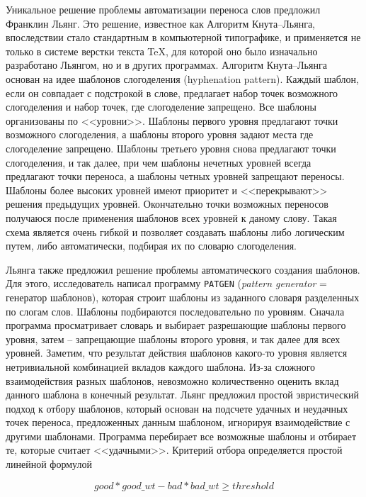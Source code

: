 \documentclass[12pt,a4paper,oneside]{extarticle}
\begin{document}
Уникальное решение проблемы автоматизации переноса слов предложил Франклин Льянг\autocite[][]{liang1983}. Это решение, известное как Алгоритм Кнута--Льянга, впоследствии стало стандартным в компьютерной типографике, и применяется не только в системе верстки текста \TeX{}, для которой оно было изначально разработано Льянгом, но и в других программах\autocite[Первое описание системы \TeX{} см. ][]{knuth1979}. Алгоритм Кнута--Льянга основан на идее шаблонов слогоделения (\textenglish{hyphenation pattern}).
Каждый шаблон, если он совпадает с подстрокой в слове, предлагает набор точек возможного слогоделения и набор точек, где слогоделение запрещено. Все шаблоны организованы по <<уровни>>. Шаблоны первого уровня предлагают точки возможного слогоделения, а шаблоны второго уровня
задают места где слогоделение запрещено. Шаблоны третьего уровня снова предлагают точки слогоделения, и так далее, при чем шаблоны нечетных уровней
всегда предлагают точки переноса, а шаблоны четных уровней запрещают переносы. 
Шаблоны более высоких уровней имеют приоритет и <<перекрывают>>
решения предыдущих уровней. Окончательно точки возможных переносов
получаюся после применения шаблонов всех уровней к даному слову. Такая схема является
очень гибкой и позволяет создавать шаблоны либо логическим путем, либо автоматически,
подбирая их по словарю слогоделения.

Льянга также предложил решение проблемы автоматического создания шаблонов. Для этого, исследователь написал программу \verb+PATGEN+ (\emph{pattern generator} = генератор шаблонов), которая строит шаблоны из заданного словаря разделенных по слогам слов. Шаблоны подбираются последовательно по уровням. Сначала программа просматривает словарь и выбирает разрешающие шаблоны первого уровня, затем -- запрещающие шаблоны второго уровня, и так далее для всех уровней. Заметим, что результат действия шаблонов какого-то уровня
является нетривиальной комбинацией вкладов каждого шаблона. Из-за сложного взаимодействия разных шаблонов, невозможно
количественно оценить вклад данного шаблона в конечный результат. Льянг предложил простой эвристический подход к отбору шаблонов,
который основан на подсчете удачных и неудачных точек переноса, предложенных данным шаблоном, игнорируя взаимодействие с другими шаблонами. Программа перебирает все возможные шаблоны и отбирает те, которые считает <<удачными>>. Критерий отбора определяется простой линейной формулой

\begin{equation}
\label{eff_formula}
good * good\_wt - bad * bad\_wt \geq threshold
\end{equation}
\end{document}
